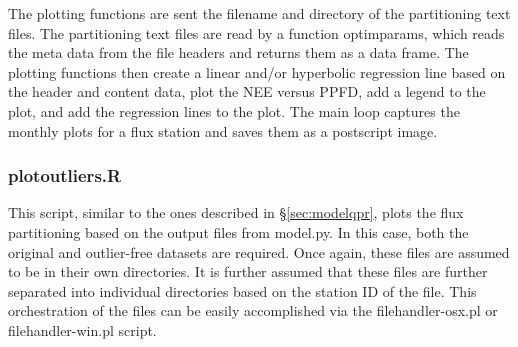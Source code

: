 The plotting functions are sent the filename and directory of the partitioning text files.  
The partitioning text files are read by a function optim\textunderscore params, which reads the meta data from the file headers and returns them as a data frame.  
The plotting functions then create a linear and/or hyperbolic regression line based on the header and content data, plot the NEE versus PPFD, add a legend to the plot, and add the regression lines to the plot. 
The main loop captures the monthly plots for a flux station and saves them as a postscript image.

\subsubsection{plot\textunderscore outliers.R}
\label{sec:modelpor}
This script, similar to the ones described in \S \ref{sec:modelqpr}, plots the flux partitioning based on the output files from model.py.  
In this case, both the original and outlier-free datasets are required.  
Once again, these files are assumed to be in their own directories.  
It is further assumed that these files are further separated into individual directories based on the station ID of the file.  
This orchestration of the files can be easily accomplished via the file\textunderscore handler-osx.pl or file\textunderscore handler-win.pl script.

